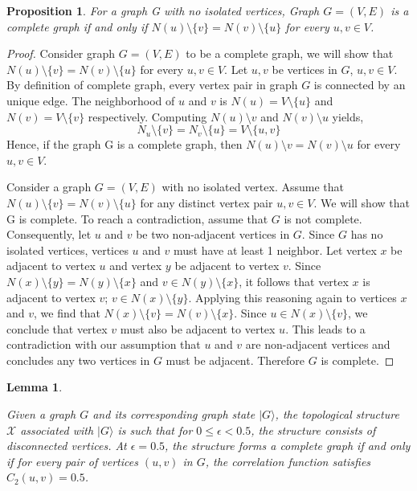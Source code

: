 \documentclass{article}
\newtheorem{lemma}[theorem]{Lemma}
\newtheorem{prop}{Proposition}
\newcommand{\ket}[1]{|#1\rangle}
\begin{document}
\begin{prop}
\label{prop:complete_graph_iff_neighbor_set_condition}
   For a graph G with no isolated vertices, Graph $G = (V, E)$ is a complete graph if and only if $N(u) \setminus \{v\} = N(v)\setminus \{u\}$ for every $u,v \in V$.
\end{prop}
\begin{proof} 
Consider graph $G = (V, E)$ to be a complete graph, we will show that $N(u) \setminus \{v\} = N(v)\setminus \{u\}$ for every $u,v \in V$. Let $u, v$ be vertices in $G$, $u, v \in V$. By definition of complete graph, every vertex pair in graph $G$ is connected by an unique edge. The neighborhood of $u$ and $v$ is $N(u) = V \setminus \{u\}$ and $N(v) = V \setminus \{v\}$ respectively. Computing $N(u) \setminus v$ and $N(v) \setminus u$ yields, 
\begin{equation}
N_u \setminus \{v\} = N_v \setminus \{u\} = V \setminus \{u, v\}    
\end{equation}
Hence, if the graph G is a complete graph, then $N(u) \setminus v = N(v)\setminus u$ for every $u,v \in V$.

Consider a graph $ G = (V, E) $ with no isolated vertex. Assume that $ N(u) \setminus \{v\} = N(v) \setminus \{u\} $ for any distinct vertex pair $ u, v \in V $. We will show that G is complete. To reach a contradiction, assume that $G$ is not complete. Consequently, let $ u $ and $ v $ be two non-adjacent vertices in $ G $. Since $ G $ has no isolated vertices, vertices $u$ and $v$ must have at least 1 neighbor. Let vertex $x$ be adjacent to vertex $u$ and vertex $y$ be adjacent to vertex $v$. Since $ N(x) \setminus \{y\} = N(y) \setminus \{x\} $ and $v \in N(y) \setminus \{x\}$, it follows that vertex $ x $ is adjacent to vertex $ v $; $v \in N(x) \setminus \{y\}$. Applying this reasoning again to vertices $ x $ and $ v $, we find that $N(x) \setminus \{v\} = N(v) \setminus \{x\}.$ Since $ u \in N(x) \setminus \{v\} $, we conclude that vertex $ v $ must also be adjacent to vertex $ u $. This leads to a contradiction with our assumption that $ u $ and $ v $ are non-adjacent vertices and concludes any two vertices in $G$ must be adjacent. Therefore $G$ is complete.
\end{proof}

\begin{lemma} \label{lemma:correlation_function_value_relation_with_topological_graph}
 
Given a graph $ G $ and its corresponding graph state $ \ket{G} $, the topological structure $ \mathcal{X} $ associated with $ \ket{G} $ is such that for $ 0 \leq \epsilon < 0.5 $, the structure consists of disconnected vertices. At $ \epsilon = 0.5 $, the structure forms a complete graph if and only if for every pair of vertices $ (u, v) $ in $ G $, the correlation function satisfies $ C_2(u, v) = 0.5 $.
\end{lemma}
\end{document}
